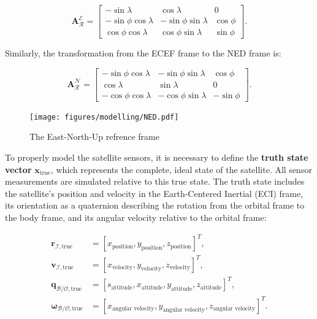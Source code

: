 \begin{equation}
\mathbf{A}_\mathcal{R}^{\mathcal{E}} =
\begin{bmatrix}
-\sin\lambda & \cos\lambda & 0 \\
-\sin\phi\cos\lambda & -\sin\phi\sin\lambda & \cos\phi \\
\cos\phi\cos\lambda & \cos\phi\sin\lambda & \sin\phi
\end{bmatrix}
\label{eq:ecef2enu}
\text{.}
\end{equation}

\noindent Similarly, the transformation from the ECEF frame to the NED frame is:

\begin{equation}
\mathbf{A}_\mathcal{R}^{\mathcal{N}} =
\begin{bmatrix}
-\sin\phi\cos\lambda & -\sin\phi\sin\lambda & \cos\phi \\
\cos\lambda & \sin\lambda & 0 \\
-\cos\phi\cos\lambda & -\cos\phi\sin\lambda & -\sin\phi
\end{bmatrix}
\label{eq:ecef2ned}
\text{.}
\end{equation}

\begin{figure}[H]
    \centering
    \texttt{[image: figures/modelling/NED.pdf]}
    \caption{The East-North-Up refrence frame}
    \label{fig:ENU}
\end{figure}


\label{sec:SensorModelling}

\noindent
To properly model the satellite sensors, it is necessary to define the \textbf{truth state vector} $\mathbf{x}_\text{true}$, which represents the complete, ideal state of the satellite. All sensor measurements are simulated relative to this true state. The truth state includes the satellite's position and velocity in the Earth-Centered Inertial (ECI) frame, its orientation as a quaternion describing the rotation from the orbital frame to the body frame, and its angular velocity relative to the orbital frame:

\begin{equation}
\begin{split}
\mathbf{r}_{\mathcal{I},\text{true}} &= [x_\text{position}, y_\text{position}, z_\text{position}]^T, \\
\mathbf{v}_{\mathcal{I},\text{true}} &= [x_\text{velocity}, y_\text{velocity}, z_\text{velocity}]^T, \\
\mathbf{q}_{\mathcal{B/O},\text{true}} &= [s_\text{attitude}, x_\text{attitude}, y_\text{attitude}, z_\text{attitude}]^T, \\
\boldsymbol{\omega}_{\mathcal{B/O},\text{true}} &= [x_\text{angular velocity}, y_\text{angular velocity}, z_\text{angular velocity}]^T.
\end{split}
\end{equation}

